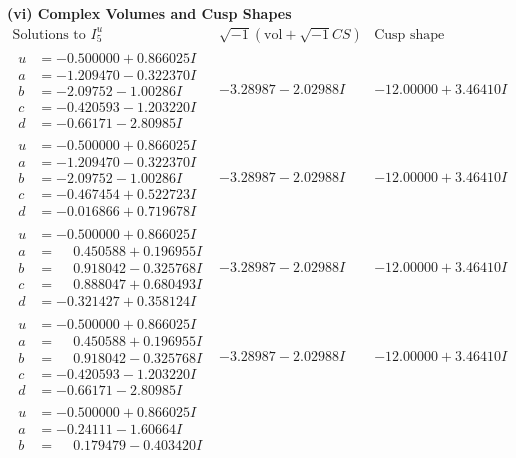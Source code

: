 \documentclass[1p]{elsarticle_modified}
\theoremstyle{definition}
\newcommand{\I}{\sqrt{-1}}
\begin{document}
\newpage\flushleft \textbf{(vi) Complex Volumes and Cusp Shapes}
$$\begin{array}{c|c|c}  
\text{Solutions to }I^u_{5}& \I (\text{vol} + \sqrt{-1}CS) & \text{Cusp shape}\\
 \hline 
\begin{aligned}
u &= -0.500000 + 0.866025 I \\
a &= -1.209470 - 0.322370 I \\
b &= -2.09752 - 1.00286 I \\
c &= -0.420593 - 1.203220 I \\
d &= -0.66171 - 2.80985 I\end{aligned}
 & -3.28987 - 2.02988 I & -12.00000 + 3.46410 I \\ \hline\begin{aligned}
u &= -0.500000 + 0.866025 I \\
a &= -1.209470 - 0.322370 I \\
b &= -2.09752 - 1.00286 I \\
c &= -0.467454 + 0.522723 I \\
d &= -0.016866 + 0.719678 I\end{aligned}
 & -3.28987 - 2.02988 I & -12.00000 + 3.46410 I \\ \hline\begin{aligned}
u &= -0.500000 + 0.866025 I \\
a &= \phantom{-}0.450588 + 0.196955 I \\
b &= \phantom{-}0.918042 - 0.325768 I \\
c &= \phantom{-}0.888047 + 0.680493 I \\
d &= -0.321427 + 0.358124 I\end{aligned}
 & -3.28987 - 2.02988 I & -12.00000 + 3.46410 I \\ \hline\begin{aligned}
u &= -0.500000 + 0.866025 I \\
a &= \phantom{-}0.450588 + 0.196955 I \\
b &= \phantom{-}0.918042 - 0.325768 I \\
c &= -0.420593 - 1.203220 I \\
d &= -0.66171 - 2.80985 I\end{aligned}
 & -3.28987 - 2.02988 I & -12.00000 + 3.46410 I \\ \hline\begin{aligned}
u &= -0.500000 + 0.866025 I \\
a &= -0.24111 - 1.60664 I \\
b &= \phantom{-}0.179479 - 0.403420 I \\

\end{aligned}
\end{array}$$
\end{document}
